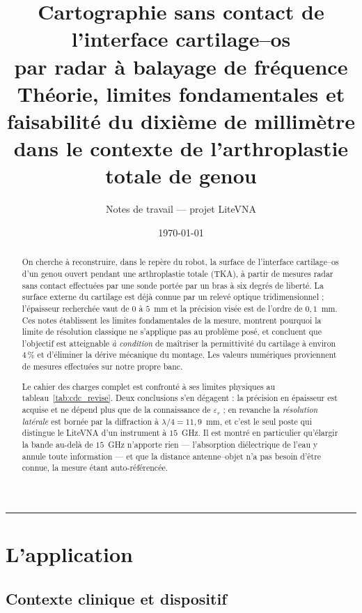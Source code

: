 \documentclass[11pt,a4paper]{article}
\title{\bfseries Cartographie sans contact de l'interface cartilage--os\\
       par radar à balayage de fréquence\\[2mm]
       \large Théorie, limites fondamentales et faisabilité du dixième de
       millimètre\\ dans le contexte de l'arthroplastie totale de genou}
\author{Notes de travail --- projet LiteVNA}
\date{\today}
\newcommand{\eps}{\varepsilon_r}
\begin{document}
\maketitle

\begin{abstract}
\noindent
On cherche à reconstruire, dans le repère du robot, la surface de l'interface
cartilage--os d'un genou ouvert pendant une arthroplastie totale (TKA), à partir
de mesures radar sans contact effectuées par une sonde portée par un bras à
six degrés de liberté. La surface externe du cartilage est déjà connue par un
relevé optique tridimensionnel ; l'épaisseur recherchée vaut de $0$ à $5$~mm et
la précision visée est de l'ordre de $0{,}1$~mm. Ces notes établissent les
limites fondamentales de la mesure, montrent pourquoi la limite de résolution
classique ne s'applique pas au problème posé, et concluent que l'objectif est
atteignable \emph{à condition} de maîtriser la permittivité du cartilage à
environ $4\,\%$ et d'éliminer la dérive mécanique du montage. Les valeurs
numériques proviennent de mesures effectuées sur notre propre banc.

\medskip\noindent
Le cahier des charges complet est confronté à ses limites physiques au
tableau~\ref{tab:cdc_revise}. Deux conclusions s'en dégagent : la précision en
épaisseur est acquise et ne dépend plus que de la connaissance de $\eps$ ;
en revanche la \emph{résolution latérale} est bornée par la diffraction à
$\lambda/4 = 11{,}9$~mm, et c'est le seul poste qui distingue le LiteVNA d'un
instrument à $15$~GHz. Il est montré en particulier qu'élargir la bande au-delà
de $15$~GHz n'apporte rien --- l'absorption diélectrique de l'eau y annule toute
information --- et que la distance antenne--objet n'a pas besoin d'être connue,
la mesure étant auto-référencée.
\end{abstract}

\tableofcontents
\bigskip\hrule\bigskip

\section{L'application}

\subsection{Contexte clinique et dispositif}
\end{document}
